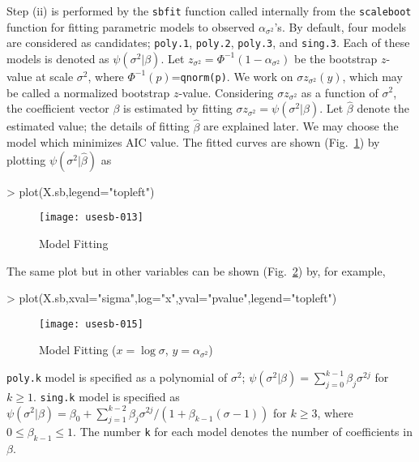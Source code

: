 \documentclass[a4paper]{amsart}
\begin{document}
Step (ii) is performed by the {\tt sbfit} function called internally
from the {\tt scaleboot} function for fitting parametric models to
observed $\alpha_{\sigma^2}$'s.  By default, four models are
considered as candidates; {\tt poly.1}, {\tt poly.2}, {\tt poly.3},
and {\tt sing.3}. Each of these models is denoted as
$\psi(\sigma^2|\beta)$. Let $z_{\sigma^2} = \Phi^{-1}( 1 -
\alpha_{\sigma^2})$ be the bootstrap $z$-value at scale $\sigma^2$,
where $\Phi^{-1}(p)$={\tt qnorm(p)}.  We work on $\sigma
z_{\sigma^2}(y)$, which may be called a normalized bootstrap
$z$-value.  Considering $\sigma z_{\sigma^2}$ as a function of
$\sigma^2$, the coefficient vector $\beta$ is estimated by fitting
$\sigma z_{\sigma^2} = \psi(\sigma^2 | \beta)$.  Let $\hat\beta$
denote the estimated value; the details of fitting $\hat\beta$ are
explained later.  We may choose the model which minimizes AIC
value. The fitted curves are shown (Fig.~\ref{fig:diag1f}) by plotting
$\psi(\sigma^2|\hat\beta)$ as
\begin{Schunk}
\begin{Sinput}
> plot(X.sb,legend="topleft")
\end{Sinput}
\end{Schunk}
\begin{figure}
\begin{center}
\texttt{[image: usesb-013]}
\caption{Model Fitting}\label{fig:diag1f}
\end{center}
\end{figure}
The same plot but in other variables can be shown
(Fig.~\ref{fig:diag1f2}) by, for example,
\begin{Schunk}
\begin{Sinput}
> plot(X.sb,xval="sigma",log="x",yval="pvalue",legend="topleft")
\end{Sinput}
\end{Schunk}
\begin{figure}
\begin{center}
\texttt{[image: usesb-015]}
\caption{Model Fitting ($x=\log \sigma$, $y=\alpha_{\sigma^2}$)}
\label{fig:diag1f2}
\end{center}
\end{figure}



{\tt poly.k} model is specified as a polynomial of $\sigma^2$;
$\psi(\sigma^2|\beta) = \sum_{j=0}^{k-1} \beta_j \sigma^{2j}$ for
$k\ge1$.  {\tt sing.k} model is specified as $\psi(\sigma^2|\beta) =
\beta_0 + \sum_{j=1}^{k-2} \beta_j \sigma^{2j}/(1 +
\beta_{k-1}(\sigma-1))$ for $k\ge3$, where $0\le\beta_{k-1}\le1$. The
number {\tt k} for each model denotes the number of coefficients in
$\beta$.
\end{document}
